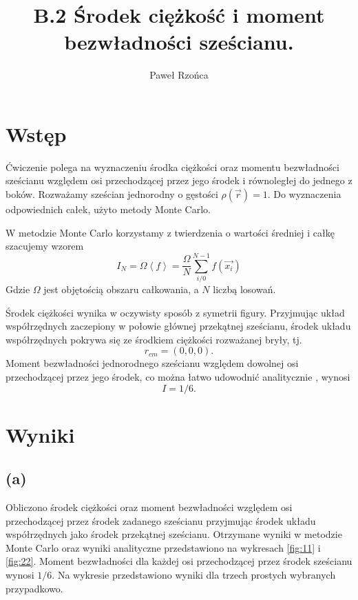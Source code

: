 \documentclass[11pt]{article}
\title{B.2 Środek ciężkość i moment bezwładności sześcianu.}
\author{Paweł Rzońca}
\begin{document}
\maketitle

\section*{Wstęp}

Ćwiczenie polega na wyznaczeniu środka ciężkości oraz momentu bezwładności sześcianu względem osi przechodzącej przez
jego środek i równoległej do jednego z boków. Rozważamy sześcian jednorodny o gęstości $\rho (\vec{r})=1$. 
Do wyznaczenia odpowiednich całek, użyto metody Monte Carlo.

W metodzie Monte Carlo korzystamy z twierdzenia o wartości średniej i całkę szacujemy wzorem
\begin{equation}
	I_N =\Omega \left< f \right> =  \frac{\Omega}{N}\sum_{i/0}^{N-1} f(\vec{x_i})
\end{equation}
Gdzie $\Omega$ jest objętością obszaru całkowania, a $N$ liczbą losowań. 

Środek ciężkości wynika w oczywisty sposób z symetrii figury. Przyjmując układ współrzędnych zaczepiony w połowie głównej przekątnej
sześcianu, środek układu współrzędnych pokrywa się ze środkiem ciężkości rozważanej bryły, tj. 
\begin{equation}
r_{cm}=(0,0,0).
\end{equation} 
Moment bezwładności jednorodnego sześcianu względem dowolnej osi przechodzącej przez jego środek, co można łatwo udowodnić analitycznie
, wynosi 
\begin{equation}
I = 1/6.
\end{equation}

\section*{Wyniki}
\subsection*{(a)}
Obliczono środek ciężkości oraz moment bezwładności względem osi przechodzącej przez środek 
zadanego sześcianu przyjmując środek układu współrzędnych jako środek przekątnej sześcianu. Otrzymane wyniki 
w metodzie Monte Carlo oraz wyniki analityczne przedstawiono na wykresach \ref{fig:11} i \ref{fig:22}. 
Moment bezwładności dla każdej osi przechodzącej przez środek sześcianu wynosi $1/6$. Na wykresie przedstawiono
wyniki dla trzech prostych wybranych przypadkowo.
\end{document}
